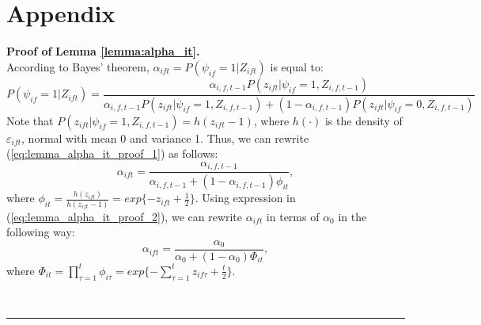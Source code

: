 \documentclass[12pt]{article}
\newenvironment{proof}[1][Proof of]{\noindent\textbf{#1} }{\ \rule{0.5em}{0.5em}}
\begin{document}
\section*{Appendix} \label{sec:appendixa}
\begin{proof}
\textbf{Lemma \ref{lemma:alpha_it}.}\\
According to Bayes' theorem, $\alpha_{ift} = P(\psi_{if}=1\vert Z_{ift})$ is equal to:
\begin{equation}\label{eq:lemma_alpha_it_proof_1}
P(\psi_{if}=1\vert Z_{ift})=\frac{\alpha_{i,f,t-1}P(z_{ift} \vert \psi_{if}=1, Z_{i,f,t-1})}{\alpha_{i,f,t-1}P(z_{ift} \vert \psi_{if}=1, Z_{i,f,t-1})+(1-\alpha_{i,f,t-1})P(z_{ift} \vert \psi_{if}=0, Z_{i,f,t-1})}
\end{equation}
Note that $P(z_{ift} \vert \psi_{if}=1, Z_{i,f,t-1})=h(z_{ift}-1)$, where $h(\cdot)$ is the density of $\varepsilon_{ift}$, normal with mean 0 and variance 1. Thus, we can rewrite (\ref{eq:lemma_alpha_it_proof_1}) as follows:
\begin{equation}\label{eq:lemma_alpha_it_proof_2}
\alpha_{ift} = \frac{\alpha_{i,f,t-1}}{\alpha_{i,f,t-1} + (1-\alpha_{i,f,t-1})\phi_{it}},
\end{equation}
where $\phi_{it} = \frac{h(z_{ift})}{h(z_{ift}-1)} = exp\lbrace -z_{ift}+\frac{1}{2} \rbrace$. Using expression in (\ref{eq:lemma_alpha_it_proof_2}), we can rewrite $\alpha_{ift}$ in terms of $\alpha_0$ in the following way:
\begin{equation}\label{eq:lemma_alpha_it_proof_3}
\alpha_{ift} = \frac{\alpha_{0}}{\alpha_{0} + (1-\alpha_{0})\Phi_{it}},
\end{equation}
where $\Phi_{it} = \prod_{\tau=1}^t \phi_{i\tau} = exp\lbrace -\sum_{\tau=1}^t z_{if\tau}+\frac{t}{2} \rbrace$.

\end{proof}
\end{document}
